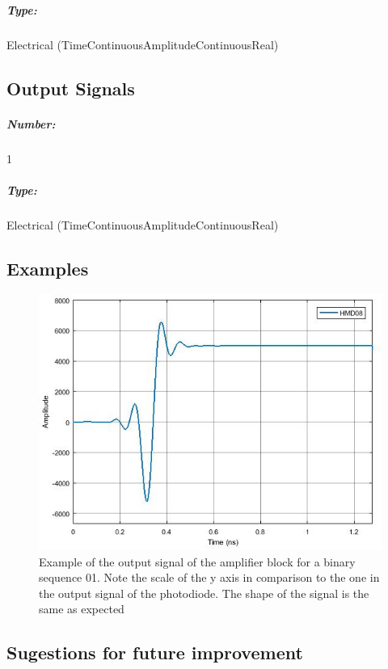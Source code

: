 \subparagraph*{Type:} Electrical (TimeContinuousAmplitudeContinuousReal)

\subsection*{Output Signals}

\subparagraph*{Number:} 1

\subparagraph*{Type:} Electrical (TimeContinuousAmplitudeContinuousReal)

\subsection*{Examples} 

\begin{figure}[h]
	\centering
	\includegraphics[width=\textwidth]{../homodyne_receiver/figures/TIAmplifier_output}
	\caption{Example of the output signal of the amplifier block for a binary sequence 01. Note the scale of the y axis in comparison to the one in the output signal of the photodiode. The shape of the signal is the same as expected}\label{TIAmplifier_output}
\end{figure}

\subsection*{Sugestions for future improvement}


